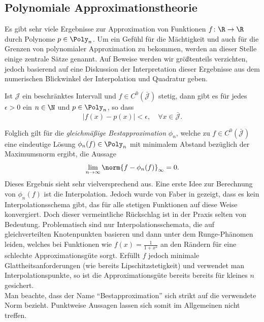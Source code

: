 \subsection{Polynomiale Approximationstheorie}
\label{sec:poly_approx}
Es gibt sehr viele Ergebnisse zur Approximation von Funktionen $f\colon \R\to\R$ durch Polynome $p\in\Poly_n$. Um ein Gefühl für die Mächtigkeit und auch für die Grenzen von polynomialer Approximation zu bekommen, werden an dieser Stelle einige zentrale Sätze genannt. Auf Beweise werden wir größtenteils verzichten, jedoch basierend auf \autocite{Trefethen} eine Diskussion der Interpretation dieser Ergebnisse aus dem numerischen Blickwinkel der Interpolation und Quadratur geben.
\begin{maththeorem}[Weierstrass]
Ist $\mathcal{J}$ ein beschränktes Intervall und $f\in C^0(\bar{\mathcal{J}})$ stetig, dann gibt es für jedes $\epsilon >0$ ein $n\in\N$ und $p\in\Poly_n$, so dass
\[|f(x)-p(x)|<\epsilon,\quad \forall x\in\bar{\mathcal{J}}.\]
\end{maththeorem}
Folglich gilt für die \emph{gleichmäßige Bestapproximation} $\phi_n$, welche zu $f\in C^0(\bar{\mathcal{J}})$ eine eindeutige Lösung $\phi_n(f)\in\Poly_n$ mit minimalem Abstand bezüglich der Maximumsnorm ergibt, die Aussage
\[\lim\limits_{n\to\infty}\norm{f-\phi_n(f)}_\infty=0.\] 
Dieses Ergebnis sieht sehr vielversprechend aus. Eine erste Idee zur Berechnung von $\phi_n(f)$ ist die Interpolation. Jedoch wurde von Faber in \autocite{faber14} gezeigt, dass es kein Interpolationsschema gibt, das für alle stetigen Funktionen auf diese Weise konvergiert. Doch dieser vermeintliche Rückschlag ist in der Praxis selten von Bedeutung. Problematisch sind nur Interpolationsschemata, die auf gleichverteilten Knotenpunkten basieren und dann unter dem Runge-Phänomen leiden, welches bei Funktionen wie $f(x)=\frac{1}{1+x^2}$ an den Rändern für eine schlechte Approximationsgüte sorgt. Erfüllt $f$ jedoch minimale Glattheitsanforderungen (wie bereits Lipschitzstetigkeit) und verwendet man \chebyspace Interpolationspunkte, so ist die Approximationsgüte bereits bereits für kleines $n$ gesichert.\\
Man beachte, dass der Name "`Bestapproximation"' sich strikt auf die verwendete Norm bezieht. Punktweise Aussagen lassen sich somit im Allgemeinen nicht treffen. 
